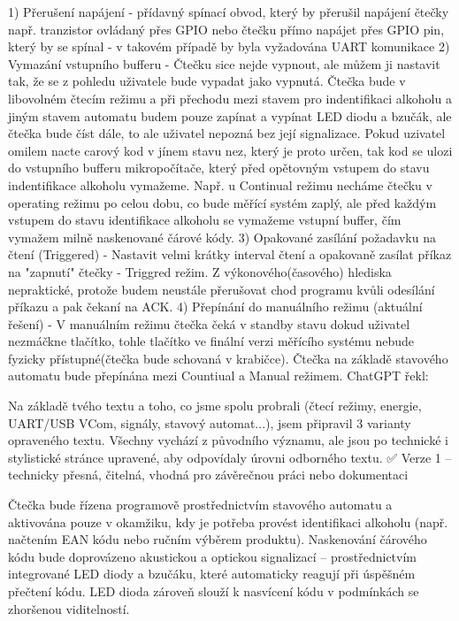 	1) Přerušení napájení - přídavný spínací obvod, který by přerušil napájení čtečky např. tranzistor ovládaný přes GPIO nebo čtečku přímo napájet přes GPIO pin, který by se spínal - v takovém případě by byla vyžadována UART komunikace
	2) Vymazání vstupního bufferu - Čtečku sice nejde vypnout, ale můžem ji nastavit tak, že se z pohledu uživatele bude vypadat jako vypnutá. Čtečka bude v libovolném čtecím režimu a při přechodu mezi stavem pro indentifikaci alkoholu a jiným stavem automatu budem pouze zapínat a vypínat LED diodu a bzučák, ale čtečka bude číst dále, to ale uživatel nepozná bez její signalizace. Pokud uzivatel omilem nacte carový kod v jínem stavu nez, který je proto určen, tak kod se ulozi do vstupního bufferu mikropočítače, který před opětovným vstupem do stavu indentifikace alkoholu vymažeme. Např. u Continual režimu necháme čtečku v operating režimu po celou dobu, co bude měřící systém zaplý, ale před každým vstupem do stavu identifikace alkoholu se vymažeme vstupní buffer, čím vymažem milně naskenované čárové kódy.  
	3) Opakované zasílání požadavku na čtení (Triggered) - Nastavit velmi krátky interval čtení a opakovaně zasílat příkaz na "zapnutí" čtečky - Triggred režim. Z výkonového(časového) hlediska nepraktické, protože budem neustále přerušovat chod programu kvůli odesílání příkazu a pak čekaní na ACK.
	4) Přepínání do manuálního režimu (aktuální řešení) - V manuálním režimu čtečka čeká v standby stavu dokud uživatel nezmáčkne tlačítko, tohle tlačítko ve finální verzi měřícího systému nebude fyzicky přístupné(čtečka bude schovaná v krabičce). Čtečka na základě stavového automatu bude přepínána mezi Countiual a Manual režimem.
ChatGPT řekl:

Na základě tvého textu a toho, co jsme spolu probrali (čtecí režimy, energie, UART/USB VCom, signály, stavový automat...), jsem připravil 3 varianty opraveného textu. Všechny vychází z původního významu, ale jsou po technické i stylistické stránce upravené, aby odpovídaly úrovni odborného textu.
✅ Verze 1 – technicky přesná, čitelná, vhodná pro závěrečnou práci nebo dokumentaci

    Čtečka bude řízena programově prostřednictvím stavového automatu a aktivována pouze v okamžiku, kdy je potřeba provést identifikaci alkoholu (např. načtením EAN kódu nebo ručním výběrem produktu). Naskenování čárového kódu bude doprovázeno akustickou a optickou signalizací – prostřednictvím integrované LED diody a bzučáku, které automaticky reagují při úspěšném přečtení kódu. LED dioda zároveň slouží k nasvícení kódu v podmínkách se zhoršenou viditelností.

